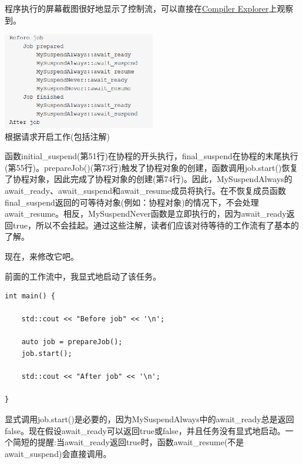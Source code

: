 程序执行的屏幕截图很好地显示了控制流，可以直接在\href{https://godbolt.org/z/T5rcE4}{Compiler Explorer}上观察到。

\begin{center}
\includegraphics[width=0.5\textwidth]{content/3/chapter7/images/19.png}\\
根据请求开启工作(包括注解)
\end{center}

函数initial\_suspend(第51行)在协程的开头执行，final\_suspend在协程的末尾执行(第55行)。prepareJob()(第73行)触发了协程对象的创建，函数调用job.start()恢复了协程对象，因此完成了协程对象的创建(第74行)。因此，MySuspendAlways的await\_ready、await\_suspend和await\_resume成员将执行。在不恢复成员函数final\_suspend返回的可等待对象(例如：协程对象)的情况下，不会处理await\_resume。相反，MySuspendNever函数是立即执行的，因为await\_ready返回true，所以不会挂起。通过这些注解，读者们应该对待等待的工作流有了基本的了解。

现在，来修改它吧。


前面的工作流中，我显式地启动了该任务。

\begin{lstlisting}[style=styleCXX]
int main() {
	
	std::cout << "Before job" << '\n';
	
	auto job = prepareJob();
	job.start();
	
	std::cout << "After job" << '\n';
	
}
\end{lstlisting}

显式调用job.start()是必要的，因为MySuspendAlways中的await\_ready总是返回false。现在假设await\_ready可以返回true或false，并且任务没有显式地启动。一个简短的提醒:当await\_ready返回true时，函数await\_resume(不是await\_suspend)会直接调用。

